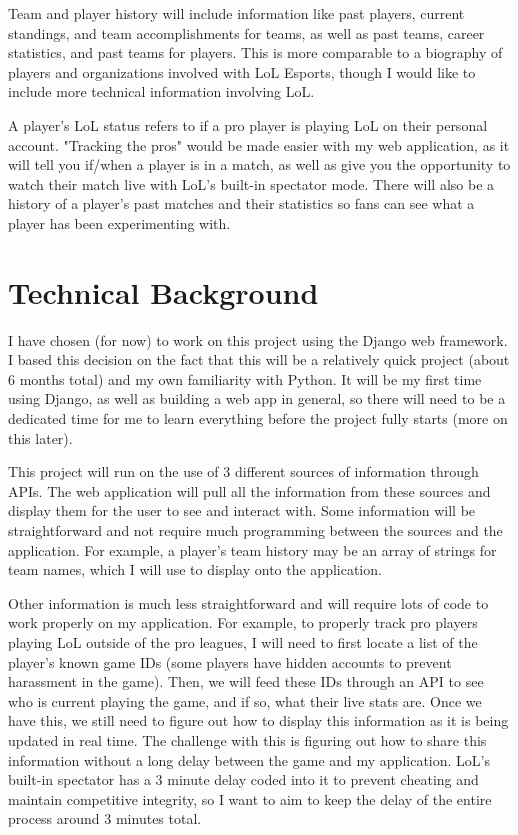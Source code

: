 \documentclass[10pt,twocolumn]{article}
\begin{document}
Team and player history will include information like past players, current standings, and team accomplishments for teams, as well as past teams, career statistics, and past teams for players.
This is more comparable to a biography of players and organizations involved with LoL Esports, though I would like to include more technical information involving LoL.

A player's LoL status refers to if a pro player is playing LoL on their personal account.
"Tracking the pros" would be made easier with my web application, as it will tell you if/when a player is in a match, as well as give you the opportunity to watch their match live with LoL's built-in spectator mode.
There will also be a history of a player's past matches and their statistics so fans can see what a player has been experimenting with.

\section{Technical Background} %
I have chosen (for now) to work on this project using the Django web framework.
I based this decision on the fact that this will be a relatively quick project (about 6 months total) and my own familiarity with Python.
It will be my first time using Django, as well as building a web app in general, so there will need to be a dedicated time for me to learn everything before the project fully starts (more on this later).

This project will run on the use of 3 different sources of information through APIs.
The web application will pull all the information from these sources and display them for the user to see and interact with.
Some information will be straightforward and not require much programming between the sources and the application.
For example, a player's team history may be an array of strings for team names, which I will use to display onto the application.

Other information is much less straightforward and will require lots of code to work properly on my application.
For example, to properly track pro players playing LoL outside of the pro leagues, I will need to first locate a list of the player's known game IDs (some players have hidden accounts to prevent harassment in the game).
Then, we will feed these IDs through an API to see who is current playing the game, and if so, what their live stats are.
Once we have this, we still need to figure out how to display this information as it is being updated in real time.
The challenge with this is figuring out how to share this information without a long delay between the game and my application.
LoL's built-in spectator has a 3 minute delay coded into it to prevent cheating and maintain competitive integrity, so I want to aim to keep the delay of the entire process around 3 minutes total.
\end{document}
